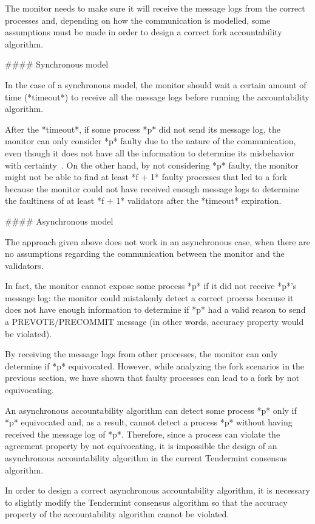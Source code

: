 \documentclass[a4paper,11pt,oneside]{report}
\begin{document}
\begin{markdown}
The monitor needs to make sure it will receive the message logs from the correct processes and, depending on how the communication is modelled, some assumptions must be made in order to design a correct fork accountability algorithm.

#### Synchronous model

In the case of a synchronous model, the monitor should wait a certain amount of time (*timeout*) to receive all the message logs before running the accountability algorithm.

After the *timeout*, if some process *p* did not send its message log, the monitor can only consider *p* faulty due to the nature of the communication, even though it does not have all the information to determine its misbehavior with certainty~\cite{fork-accountability-specs}. 
On the other hand, by not considering *p* faulty, the monitor might not be able to find at least *f + 1* faulty processes that led to a fork because the monitor could not have received enough message logs to determine the faultiness of at least *f + 1* validators after the *timeout* expiration.

#### Asynchronous model

The approach given above does not work in an asynchronous case, when there are no assumptions regarding the communication between the monitor and the validators. 

In fact, the monitor cannot expose some process *p* if it did not receive *p*'s message log: the monitor could mistakenly detect a correct process because it does not have enough information to determine if *p* had a valid reason to send a PREVOTE/PRECOMMIT message (in other words, accuracy property would be violated).
 
By receiving the message logs from other processes, the monitor can only determine if *p* equivocated. 
However, while analyzing the fork scenarios in the previous section, we have shown that faulty processes can lead to a fork by not equivocating. 

An asynchronous accountability algorithm can detect some process *p* only if *p* equivocated and, as a result, cannot detect a process *p* without having received the message log of *p*. Therefore, since a process can violate the agreement property by not equivocating, it is impossible the design of an asynchronous accountability algorithm in the current Tendermint consensus algorithm.  

In order to design a correct asynchronous accountability algorithm, it is necessary to slightly modify the Tendermint consensus algorithm so that the accuracy property of the accountability algorithm cannot be violated.


\end{markdown}
\end{document}
